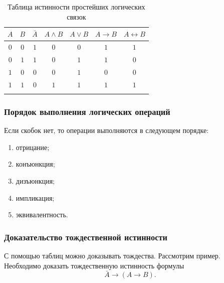 \documentclass[a5paper, 11pt]{extarticle}
\theoremstyle{definition}
\theoremstyle{definition}
\theoremstyle{definition}
\numberwithin{figure}{section}
\numberwithin{table}{section}
\begin{document}
\begin{table}[H]
    \renewcommand*{\arraystretch}{1.5}
    \begin{longtable}{|c|c|c|c|c|c|c|}
        \hline
        \(A\) & \(B\) & \(\bar{A}\) & \(A \land B\) & \(A \lor B\) & \(A \to B\) & \(A \leftrightarrow B\) \\
        \hline
        \(0\) & \(0\) & \(1\)       & \(0\)         & \(0\)        & \(1\)       & \(1\)                   \\
        \hline
        \(0\) & \(1\) & \(1\)       & \(0\)         & \(1\)        & \(1\)       & \(0\)                   \\
        \hline
        \(1\) & \(0\) & \(0\)       & \(0\)         & \(1\)        & \(0\)       & \(0\)                   \\
        \hline
        \(1\) & \(1\) & \(0\)       & \(1\)         & \(1\)        & \(1\)       & \(1\)                   \\
        \hline
        \caption{Таблица истинности простейших логических связок}
        \label{tab:truth-table-slc}
    \end{longtable}
\end{table}


\subsubsection{Порядок выполнения логических операций}

Если скобок нет, то операции выполняются в следующем порядке:
\begin{enumerate}
    \item отрицание;
    \item конъюнкция;
    \item дизъюнкция;
    \item импликация;
    \item эквивалентность.
\end{enumerate}

\subsubsection{Доказательство тождественной истинности}

С помощью таблиц можно доказывать тождества. Рассмотрим пример. Необходимо доказать тождественную истинность формулы
\[
    \bar{A} \to (A \to B).
\]
\end{document}
